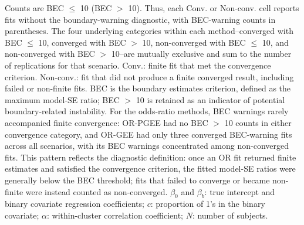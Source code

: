 \begin{table}[htbp]
\begin{flushleft}
\footnotesize Counts are BEC $\leq$ 10 (BEC $>$ 10). Thus, each Conv. or Non-conv. cell reports fits without the boundary-warning diagnostic, with BEC-warning counts in parentheses. The four underlying categories within each method--converged with BEC $\leq$ 10, converged with BEC $>$ 10, non-converged with BEC $\leq$ 10, and non-converged with BEC $>$ 10--are mutually exclusive and sum to the number of replications for that scenario. Conv.: finite fit that met the convergence criterion. Non-conv.: fit that did not produce a finite converged result, including failed or non-finite fits. BEC is the boundary estimates criterion, defined as the maximum model-SE ratio; BEC $>$ 10 is retained as an indicator of potential boundary-related instability. For the odds-ratio methods, BEC warnings rarely accompanied finite convergence: OR-PGEE had no BEC $>$ 10 counts in either convergence category, and OR-GEE had only three converged BEC-warning fits across all scenarios, with its BEC warnings concentrated among non-converged fits. This pattern reflects the diagnostic definition: once an OR fit returned finite estimates and satisfied the convergence criterion, the fitted model-SE ratios were generally below the BEC threshold; fits that failed to converge or became non-finite were instead counted as non-converged. $\beta_0$ and $\beta_b$: true intercept and binary covariate regression coefficients; $c$: proportion of 1's in the binary covariate; $\alpha$: within-cluster correlation coefficient; $N$: number of subjects.
\end{flushleft}
\end{table}
